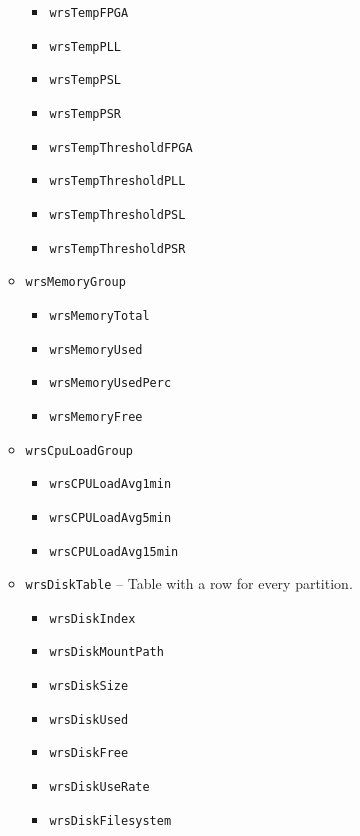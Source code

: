 \begin{itemize}
\begin{itemize}
\begin{itemize}
	  \item \texttt{wrsTempFPGA}
	  \item \texttt{wrsTempPLL}
	  \item \texttt{wrsTempPSL}
	  \item \texttt{wrsTempPSR}
	  \item \texttt{wrsTempThresholdFPGA}
	  \item \texttt{wrsTempThresholdPLL}
	  \item \texttt{wrsTempThresholdPSL}
	  \item \texttt{wrsTempThresholdPSR}
	\end{itemize}
      \item \texttt{wrsMemoryGroup}
	\begin{itemize}
	  \item \texttt{wrsMemoryTotal}
	  \item \texttt{wrsMemoryUsed}
	  \item \texttt{wrsMemoryUsedPerc}
	  \item \texttt{wrsMemoryFree}
	\end{itemize}
      \item \texttt{wrsCpuLoadGroup}
	\begin{itemize}
	  \item \texttt{wrsCPULoadAvg1min}
	  \item \texttt{wrsCPULoadAvg5min}
	  \item \texttt{wrsCPULoadAvg15min}
	\end{itemize}
      \item \texttt{wrsDiskTable} -- Table with a row for every partition.
	\begin{itemize}
	  \item \texttt{wrsDiskIndex}
	  \item \texttt{wrsDiskMountPath}
	  \item \texttt{wrsDiskSize}
	  \item \texttt{wrsDiskUsed}
	  \item \texttt{wrsDiskFree}
	  \item \texttt{wrsDiskUseRate}
	  \item \texttt{wrsDiskFilesystem}
	\end{itemize}
    \end{itemize}


\end{itemize}

